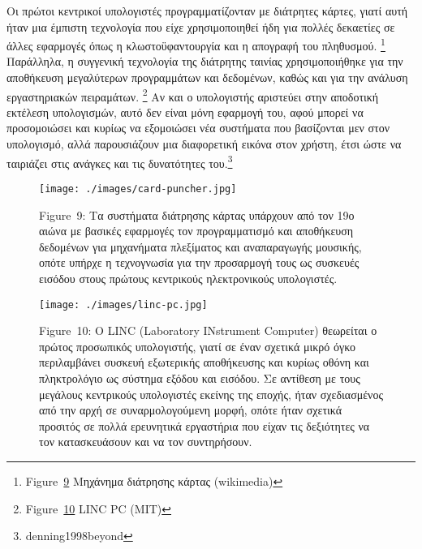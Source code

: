 \documentclass[
]{article}
\begin{document}
Οι πρώτοι κεντρικοί υπολογιστές προγραμματίζονταν με διάτρητες κάρτες,
γιατί αυτή ήταν μια έμπιστη τεχνολογία που είχε χρησιμοποιηθεί ήδη για
πολλές δεκαετίες σε άλλες εφαρμογές όπως η κλωστοϋφαντουργία και η
απογραφή του πληθυσμού. \footnote{Figure~\protect\hyperlink{fig:card-puncher}{9}
  Μηχάνημα διάτρησης κάρτας (wikimedia)} Παράλληλα, η συγγενική
τεχνολογία της διάτρητης ταινίας χρησιμοποιήθηκε για την αποθήκευση
μεγαλύτερων προγραμμάτων και δεδομένων, καθώς και για την ανάλυση
εργαστηριακών πειραμάτων. \footnote{Figure~\protect\hyperlink{fig:linc-pc}{10}
  LINC PC (MIT)} Αν και ο υπολογιστής αριστεύει στην αποδοτική εκτέλεση
υπολογισμών, αυτό δεν είναι μόνη εφαρμογή του, αφού μπορεί να
προσομοιώσει και κυρίως να εξομοιώσει νέα συστήματα που βασίζονται μεν
στον υπολογισμό, αλλά παρουσιάζουν μια διαφορετική εικόνα στον χρήστη,
έτσι ώστε να ταιριάζει στις ανάγκες και τις δυνατότητες του.\footnote{denning1998beyond}

\leavevmode{}%
\begin{figure}
\hypertarget{fig:card-puncher}{%
\centering
\texttt{[image: ./images/card-puncher.jpg]}
\caption{Figure~9: Τα συστήματα διάτρησης κάρτας υπάρχουν από τον 19ο
αιώνα με βασικές εφαρμογές τον προγραμματισμό και αποθήκευση δεδομένων
για μηχανήματα πλεξίματος και αναπαραγωγής μουσικής, οπότε υπήρχε η
τεχνογνωσία για την προσαρμογή τους ως συσκευές εισόδου στους πρώτους
κεντρικούς ηλεκτρονικούς υπολογιστές.}\label{fig:card-puncher}
}
\end{figure}

\leavevmode{}%
\begin{figure}
\hypertarget{fig:linc-pc}{%
\centering
\texttt{[image: ./images/linc-pc.jpg]}
\caption{Figure~10: O LINC (Laboratory INstrument Computer) θεωρείται ο
πρώτος προσωπικός υπολογιστής, γιατί σε έναν σχετικά μικρό όγκο
περιλαμβάνει συσκευή εξωτερικής αποθήκευσης και κυρίως οθόνη και
πληκτρολόγιο ως σύστημα εξόδου και εισόδου. Σε αντίθεση με τους μεγάλους
κεντρικούς υπολογιστές εκείνης της εποχής, ήταν σχεδιασμένος από την
αρχή σε συναρμολογούμενη μορφή, οπότε ήταν σχετικά προσιτός σε πολλά
ερευνητικά εργαστήρια που είχαν τις δεξιότητες να τον κατασκευάσουν και
να τον συντηρήσουν.}\label{fig:linc-pc}
}
\end{figure}
\end{document}
